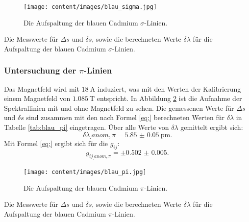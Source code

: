 \begin{figure}
	\centering
	\texttt{[image: content/images/blau\_sigma.jpg]}
	\caption{Die Aufspaltung der blauen Cadmium $\sigma$-Linien.}
	\label{fig:blau_sigma}
\end{figure}

\begin{table}
	\centering
	\caption{Die Messwerte für $\Delta s$ und $\delta s$, sowie die berechneten Werte $\delta\lambda$ für die Aufspaltung der blauen Cadmium $\sigma$-Linien.}
	
	\label{tab:blau_sigma}
\end{table}

\subsubsection{Untersuchung der $\pi$-Linien}

Das Magnetfeld wird mit $\SI{18}{\ampere}$ induziert, was mit den Werten der Kalibrierung einem Magnetfeld von $\SI{1.085}{\tesla}$ entspricht. In Abbildung \ref{fig:blau_pi} ist die Aufnahme der Spektrallinien mit und ohne Magnetfeld zu sehen. Die gemessenen Werte für $\Delta s$ und $\delta s$ sind zusammen mit den nach Formel \eqref{eq:} berechneten Werten für $\delta\lambda$ in Tabelle \ref{tab:blau_pi} eingetragen.
Über alle Werte von $\delta\lambda$ gemittelt ergibt sich:
\[
\delta\lambda_.{anom,\pi} = \SI{5.85(5)}{\pico\metre}\text{.}
\]
Mit Formel \eqref{eq:} ergibt sich für die $g_{ij}$:
\[
g_{ij_.{anom,\pi}} = \pm\num{0.502(5)}\text{.}
\]

\begin{figure}
	\centering
	\texttt{[image: content/images/blau\_pi.jpg]}
	\caption{Die Aufspaltung der blauen Cadmium $\pi$-Linien.}
	\label{fig:blau_pi}
\end{figure}

\begin{table}
	\centering
	\caption{Die Messwerte für $\Delta s$ und $\delta s$, sowie die berechneten Werte $\delta\lambda$ für die Aufspaltung der blauen Cadmium $\pi$-Linien.}
	
	\label{tab:blau_pi}
\end{table}